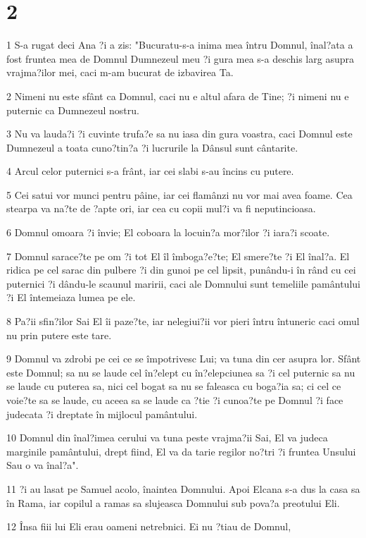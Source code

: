 \chapter{2}

\par 1 S-a rugat deci Ana ?i a zis: "Bucuratu-s-a inima mea întru Domnul, înal?ata a fost fruntea mea de Domnul Dumnezeul meu ?i gura mea s-a deschis larg asupra vrajma?ilor mei, caci m-am bucurat de izbavirea Ta.
\par 2 Nimeni nu este sfânt ca Domnul, caci nu e altul afara de Tine; ?i nimeni nu e puternic ca Dumnezeul nostru.
\par 3 Nu va lauda?i ?i cuvinte trufa?e sa nu iasa din gura voastra, caci Domnul este Dumnezeul a toata cuno?tin?a ?i lucrurile la Dânsul sunt cântarite.
\par 4 Arcul celor puternici s-a frânt, iar cei slabi s-au încins cu putere.
\par 5 Cei satui vor munci pentru pâine, iar cei flamânzi nu vor mai avea foame. Cea stearpa va na?te de ?apte ori, iar cea cu copii mul?i va fi neputincioasa.
\par 6 Domnul omoara ?i învie; El coboara la locuin?a mor?ilor ?i iara?i scoate.
\par 7 Domnul sarace?te pe om ?i tot El îl îmboga?e?te; El smere?te ?i El înal?a. El ridica pe cel sarac din pulbere ?i din gunoi pe cel lipsit, punându-i în rând cu cei puternici ?i dându-le scaunul maririi, caci ale Domnului sunt temeliile pamântului ?i El întemeiaza lumea pe ele.
\par 8 Pa?ii sfin?ilor Sai El îi paze?te, iar nelegiui?ii vor pieri întru întuneric caci omul nu prin putere este tare.
\par 9 Domnul va zdrobi pe cei ce se împotrivesc Lui; va tuna din cer asupra lor. Sfânt este Domnul; sa nu se laude cel în?elept cu în?elepciunea sa ?i cel puternic sa nu se laude cu puterea sa, nici cel bogat sa nu se faleasca cu boga?ia sa; ci cel ce voie?te sa se laude, cu aceea sa se laude ca ?tie ?i cunoa?te pe Domnul ?i face judecata ?i dreptate în mijlocul pamântului.
\par 10 Domnul din înal?imea cerului va tuna peste vrajma?ii Sai, El va judeca marginile pamântului, drept fiind, El va da tarie regilor no?tri ?i fruntea Unsului Sau o va înal?a".
\par 11 ?i au lasat pe Samuel acolo, înaintea Domnului. Apoi Elcana s-a dus la casa sa în Rama, iar copilul a ramas sa slujeasca Domnului sub pova?a preotului Eli.
\par 12 Însa fiii lui Eli erau oameni netrebnici. Ei nu ?tiau de Domnul,
